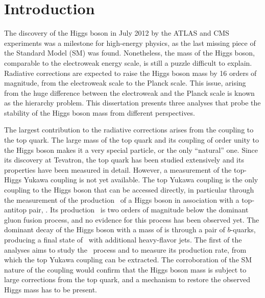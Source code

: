 \chapter*{Introduction}
\label{chapter:Introduction}

The discovery of the Higgs boson in July 2012 by the ATLAS and CMS experiments was a milestone for high-energy physics, as the last missing piece of the Standard Model (SM) was found.
Nonetheless, the mass of the Higgs boson, comparable to the electroweak energy scale, is still a puzzle difficult to explain. Radiative corrections are expected to raise the Higgs boson mass by 16 orders of magnitude, from the electroweak scale to the Planck scale. This issue,
arising from the huge difference between the electroweak and the Planck scale is known as the hierarchy problem.
This dissertation presents three analyses that probe the stability of the Higgs boson mass from different perspectives.

The largest contribution to the radiative corrections arises from the coupling to the top quark. The large mass of the top quark and its coupling of order unity to the Higgs boson makes it a very special particle, or the only ``natural'' one. Since its discovery at Tevatron, the top quark has been studied extensively and its properties have been measured in detail.
However, a measurement of the top-Higgs Yukawa coupling is not yet available.
The top Yukawa coupling is the only coupling to the Higgs boson that can be accessed directly, in particular through the measurement of the production \xsec\ of a Higgs boson in association with a top-antitop pair, \ttH. Its production \xsec\ is two orders of magnitude below the dominant gluon fusion process, and no evidence for this process has been observed yet. The dominant decay of the Higgs boson with a mass of \unit[125]{\gev} is through a pair of $b$-quarks, producing a final state of \ttbar\ with additional heavy-flavor jets. The first of the analyses aims to study the \ttH\ process and to measure its production rate, from which the top Yukawa coupling can be extracted. The corroboration of the SM nature of the coupling would confirm that the Higgs boson mass is subject to large corrections from the top quark, and a mechanism to restore the observed Higgs mass has to be present.

